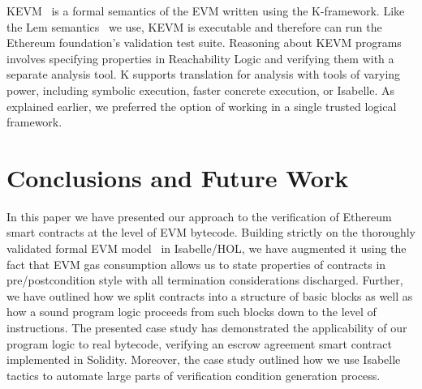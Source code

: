 \documentclass[sigplan,10pt]{acmart}\settopmatter{printfolios=true,printccs=false,printacmref=false}
\begin{document}
KEVM~\cite{Hildenbrandt_SZRDGR_17} is a formal semantics of the EVM written using the K-framework.
Like the Lem semantics~\cite{Yoichi} we use, KEVM is executable and therefore can run the Ethereum foundation's validation test suite.
Reasoning about KEVM programs involves specifying properties in Reachability Logic and
verifying them with a separate analysis tool.
K supports translation for analysis with tools of varying
power, including symbolic execution, faster concrete execution, or Isabelle.
As explained earlier, we preferred the option of working in a single trusted logical framework.



\section{Conclusions and Future Work}
\label{sec:concl}
In this paper we have presented our approach to the verification of Ethereum smart contracts
at the level of EVM bytecode. Building strictly on the thoroughly validated formal EVM model~\cite{Yoichi} in Isabelle/HOL,
we have augmented it using the fact that EVM gas consumption allows us to state properties of contracts in pre/postcondition style
with all termination considerations discharged. Further, we have outlined how we split contracts into a
structure of basic blocks as well as how a sound program logic proceeds from such blocks down to the level of instructions. 
The presented case study has demonstrated the applicability of our
program logic to real bytecode, verifying an escrow agreement smart contract
implemented in Solidity.
Moreover, the case study outlined how we use Isabelle tactics to automate
large parts of verification condition generation process.
\end{document}
